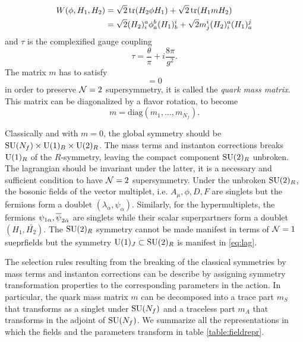     \begin{align}
        W(\phi,H_1,H_2) &= \sqrt{2}\tr(H_2\phi H_1) + \sqrt{2}\tr(H_1mH_2) \\
        &= \sqrt{2}(H_2)^a_i\phi^b_a (H_1)^i_b + \sqrt{2}m^i_j(H_2)^a_i(H_1)^j_a
    \end{align}
    and $\tau$ is the complexified gauge coupling
    \begin{equation}
        \tau=\frac{\theta}{\pi}+i\frac{8\pi}{g^2}.
    \end{equation}
    The matrix $m$ has to satisfy
    \begin{equation}
        [m,m^\dagger]=0
    \end{equation}
    in order to preserve $\mathcal{N}=2$ supersymmetry, it is called the \emph{quark mass matrix}. This matrix can be diagonalized by a flavor rotation, to become
    \begin{equation}
        m=\text{diag}(m_1,\dots,m_{N_f}).
    \end{equation}

    Classically and with $m=0$, the global symmetry should be $\text{SU}(N_f)\times\text{U}(1)_B\times\text{U}(2)_R$. The mass terms and instanton corrections breaks $\text{U}(1)_R$ of the $R$-symmetry, leaving the compact component $\text{SU}(2)_R$ unbroken. The lagrangian should be invariant under the latter, it is a necessary and sufficient condition to have $\mathcal{N}=2$ supersymmetry. Under the unbroken $\text{SU}(2)_R$, the bosonic fields of the vector multiplet, i.e. $A_\mu,\phi,D,F$ are singlets but the fermions form a doublet $(\lambda_\alpha,\psi_\alpha)$. Similarly, for the hypermultiplets, the fermions $\psi_{1\alpha},\overline{\psi}_{2\dot{\alpha}}$ are singlets while their scalar superpartners form a doublet $(H_1,\bar{H_2})$. The $\text{SU}(2)_R$ symmetry cannot be made manifest in terms of $\mathcal{N}=1$ sueprfields but the symmetry $\text{U}(1)_J\subset\text{SU}(2)_R$ is manifest in \eqref{eq:lag}.
    
    The selection rules resulting from the breaking of the classical symmetries by mass terms and instanton corrections can be describe by assigning symmetry transformation properties to the corresponding parameters in the action. In particular, the quark mass matrix $m$ can be decomposed into a trace part $m_S$ that transforms as a singlet under $\text{SU}(N_f)$ and a traceless part $m_A$ that transforms in the adjoint of $\text{SU}(N_f)$. We summarize all the representations in which the fields and the parameters transform in table \ref{table:fieldrepr}.

